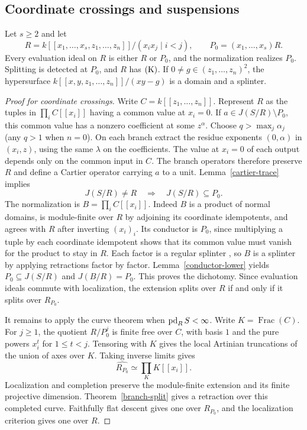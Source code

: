 \subsection{Coordinate crossings and suspensions}
\begin{theorem}\label{cross-split}
Let $s\ge2$ and let
\[
 R=k[[x_1,\ldots,x_s,z_1,\ldots,z_n]]/(x_ix_j\mid i<j),
 \qquad P_0=(x_1,\ldots,x_s)R .
\]
Every evaluation ideal on $R$ is either $R$ or $P_0$, and the normalization realizes $P_0$. Splitting is detected at $P_0$, and $R$ has $\mathrm{(K)}$.
If $0\ne g\in(z_1,\ldots,z_n)^2$, the hypersurface
$k[[x,y,z_1,\ldots,z_n]]/(xy-g)$ is a domain and a splinter.
\end{theorem}
\begin{proof}[Proof for coordinate crossings]
Write $C=k[[z_1,\ldots,z_n]]$.
Represent $R$ as the tuples in $\prod_i C[[x_i]]$ having a common value
at $x_i=0$.  If $a\in J(S/R)\setminus P_0$, this common value has a
nonzero coefficient at some $z^\alpha$.  Choose $q>\max_j\alpha_j$
(any $q>1$ when $n=0$).  On each branch extract the residue exponents
$(0,\alpha)$ in $(x_i,z)$, using the same $\lambda$ on the coefficients.
The value at $x_i=0$ of each output depends only on the common input in
$C$.  The branch operators therefore preserve $R$ and define a Cartier
operator carrying $a$ to a unit.  Lemma~\ref{cartier-trace} implies
\[
 J(S/R)\ne R\quad\Longrightarrow\quad J(S/R)\subseteq P_0.
\]
The normalization is $B=\prod_i C[[x_i]]$. Indeed $B$ is a product of normal domains, is module-finite over $R$ by adjoining its coordinate idempotents, and agrees with $R$ after inverting $(x_i)_i$. Its conductor is $P_0$, since multiplying a tuple by each coordinate idempotent shows that its common value must vanish for the product to stay in $R$. Each factor is a regular splinter \cite{Andre}, so $B$ is a splinter by applying retractions factor by factor. Lemma~\ref{conductor-lower} yields $P_0\subseteq J(S/R)$ and $J(B/R)=P_0$. This proves the dichotomy.
Since evaluation ideals commute with localization, the extension splits
over $R$ if and only if it splits over $R_{P_0}$.

It remains to apply the curve theorem when $\operatorname{pd}_R S<\infty$.
Write $K=\operatorname{Frac}(C)$.  For $j\ge1$, the quotient $R/P_0^j$
is finite free over $C$, with basis $1$ and the pure powers $x_i^t$ for
$1\le t<j$.  Tensoring with $K$ gives the local Artinian truncations of
the union of axes over $K$.  Taking inverse limits gives
\[
 \widehat{R_{P_0}}\simeq\prod_K K[[x_i]].
\]
Localization and completion preserve the module-finite extension and its finite
projective dimension.  Theorem~\ref{branch-split} gives a retraction over this completed
curve.  Faithfully flat descent gives one over $R_{P_0}$, and the
localization criterion gives one over $R$.
\end{proof}

